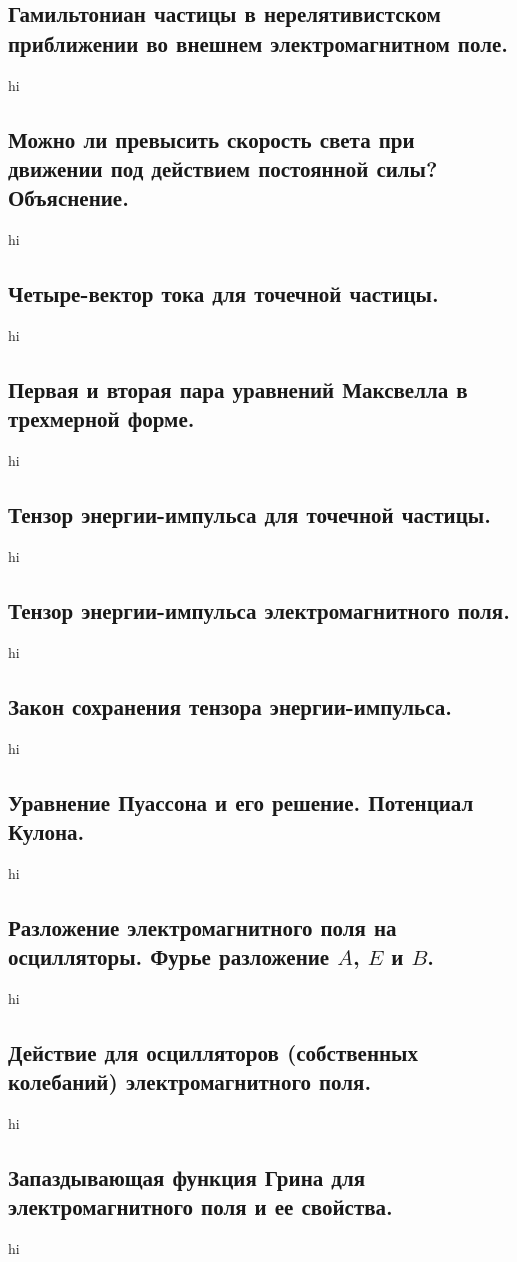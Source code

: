 \documentclass[a4paper,12pt]{article}
\begin{document}
\subsection{Гамильтониан частицы в нерелятивистском приближении во внешнем
электромагнитном поле.}
hi
\subsection{Можно ли превысить скорость света при движении под действием
постоянной силы? Объяснение.}
hi
\subsection{Четыре-вектор тока для точечной частицы.}
hi
\subsection{Первая и вторая пара уравнений Максвелла в трехмерной форме.}
hi
\subsection{Тензор энергии-импульса для точечной частицы.}
hi
\subsection{Тензор энергии-импульса электромагнитного поля.}
hi
\subsection{Закон сохранения тензора энергии-импульса.}
hi
\subsection{Уравнение Пуассона и его решение. Потенциал Кулона.}
hi
\subsection{Разложение электромагнитного поля на осцилляторы. Фурье разложение 
$A$, $E$ и $B$.}
hi
\subsection{Действие для осцилляторов (собственных колебаний)
электромагнитного поля.}
hi
\subsection{Запаздывающая функция Грина для электромагнитного поля и ее
свойства.}
hi
\end{document}
